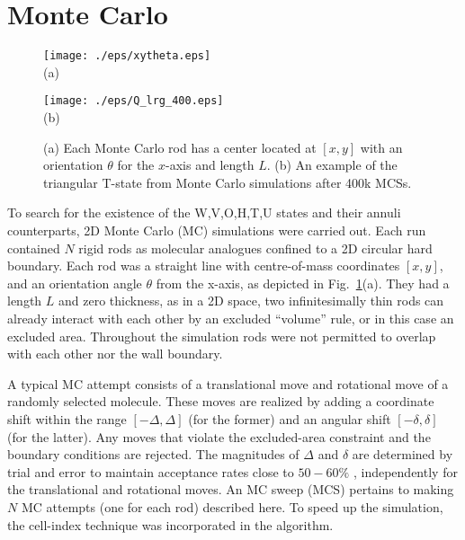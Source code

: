 \documentclass[prl,twocolumn,preprintnumbers,reprint]{revtex4}
\begin{document}
\section{Monte Carlo}
\begin{figure}
	\begin{minipage}{0.45\columnwidth}
		\texttt{[image: ./eps/xytheta.eps]}\\
		(a)
	\end{minipage}%
	\hspace{0.06\columnwidth}
	\begin{minipage}{0.45\columnwidth}
		\texttt{[image: ./eps/Q\_lrg\_400.eps]}\\
		\hspace{0.1cm}(b)
	\end{minipage}%
\caption{(a) Each Monte Carlo rod has a center located at $[x,y]$ with an orientation $\theta$ for the $x$-axis and length $L$. (b) An example of the triangular T-state from Monte Carlo simulations after 400k MCSs.}
\label{figMC}
\end{figure}

To search for the existence of the W,V,O,H,T,U states and their annuli counterparts, 2D Monte Carlo (MC) simulations were carried out. Each run contained $N$ rigid rods as molecular analogues confined to a 2D circular hard boundary. Each rod was a straight line with centre-of-mass coordinates $[x, y]$,  and an orientation angle $\theta$ from the x-axis, as depicted in Fig.\ \ref{figMC}(a). They had a length $L$ and zero thickness, as in a 2D space, two infinitesimally thin rods can already interact with each other by an excluded ``volume'' rule, or in this case an excluded area. Throughout the simulation rods were not permitted to overlap with each other nor the wall boundary.

A typical MC attempt consists of a translational move and rotational move of a randomly selected molecule. These moves are realized by adding a coordinate shift within the range $[-\Delta, \Delta]$ (for the former) and an angular shift $[-\delta, \delta]$ (for the latter). Any moves that violate the excluded-area constraint and the boundary conditions are rejected. The magnitudes of $\Delta$ and $\delta$ are determined by trial and error to maintain acceptance rates close to $ 50-60\%$ \cite{Landau}, independently for the translational and rotational moves. An MC sweep (MCS) pertains to making $N$ MC attempts (one for each rod) described here. To speed up the simulation, the cell-index technique \cite{Landau} was incorporated in the algorithm. 
\end{document}
